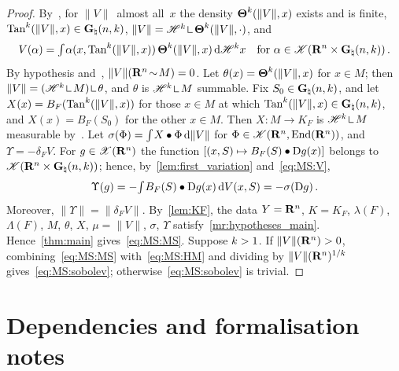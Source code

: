 \documentclass[a4paper,twoside,leqno]{article}
\begin{document}
\begin{proof}
    By~\cite[3.5(1)]{Allard1972}, for $\|V\|$~almost all~$x$ the density
    $\boldsymbol{\Theta}^{k}(\|V\|,x)$ exists and is finite, $\operatorname{Tan}^{k}(\|V\|,x) \in
    \mathbf{G}_{\natural}(n,k)$, $\|V\| = \HM^{\vdim} \restrict \density^{\vdim}(\|V\|,\cdot)$, and
    \begin{equation}
        \label{eq:MS:V}
        V(\alpha) = {\textstyle\int_{}^{}} \alpha(x,\operatorname{Tan}^{k}(\|V\|,x)) \, \boldsymbol{\Theta}^{k}(\|V\|,x) \,\mathrm{d}
        \mathscr{H}^{k} x
        \quad \text{for $\alpha \in \mathscr{K}(\mathbf{R}^{n} \times \mathbf{G}_{\natural}(n,k))$} \,.
    \end{equation}
    By hypothesis and~\cite[3.5(1)]{Allard1972}, $\|V\|(\mathbf{R}^{n} \!\sim\! M) = 0$. Let $\theta(x) = \boldsymbol{\Theta}^{k}(\|V\|,x)$
    for $x \in M$; then $\|V\| = (\HM^{\vdim} \restrict M) \restrict \theta$, and $\theta$ is
    $\HM^{\vdim} \restrict M$ summable. Fix $S_0 \in \mathbf{G}_{\natural}(n,k)$, and let $X(x) =
    B_F(\operatorname{Tan}^{k}(\|V\|,x))$ for those $x \in M$ at which $\operatorname{Tan}^{k}(\|V\|,x) \in
    \mathbf{G}_{\natural}(n,k)$, and $X(x) = B_F(S_0)$ for the other $x \in M$. Then $X : M \to K_F$ is
    $\HM^{\vdim} \restrict M$ measurable by~\cite[3.5(1)]{Allard1972}. Let $\sigma(\Phi) =
    {\textstyle\int_{}^{}} X \bullet \Phi \,\mathrm{d} \|V\|$ for $\Phi \in
    \mathscr{K}(\mathbf{R}^{n},\mathrm{End}({\mathbf{R}^{n}}))$, and $\Upsilon = - \delta_F V$. For $g \in
    \mathscr{X}(\mathbf{R}^{n})$ the function $[(x,S) \mapsto B_F(S) \bullet \mathrm{D} g(x)]$ belongs to
    $\mathscr{K}(\mathbf{R}^{n} \times \mathbf{G}_{\natural}(n,k))$; hence, by~\ref{lem:first_variation}
    and~\eqref{eq:MS:V},
    \begin{displaymath}
        \Upsilon(g) = - {\textstyle\int_{}^{}} B_F(S) \bullet \mathrm{D} g(x) \,\mathrm{d} V(x,S) = - \sigma(\mathrm{D} g) \,.
    \end{displaymath}
    Moreover, $\|\Upsilon\| = \|\delta_F V\|$. By~\ref{lem:KF}, the data $Y = \mathbf{R}^{n}$, $K =
    K_F$, $\lambda(F)$, $\Lambda(F)$, $M$, $\theta$, $X$, $\mu = \|V\|$, $\sigma$, $\Upsilon$
    satisfy~\ref{mr:hypotheses_main}. Hence~\ref{thm:main} gives~\eqref{eq:MS:MS}.
    Suppose $k > 1$. If $\|V\|(\mathbf{R}^{n}) > 0$, combining~\eqref{eq:MS:MS}
    with~\eqref{eq:MS:HM} and dividing by $\|V\|(\mathbf{R}^{n})^{1/k}$ gives~\eqref{eq:MS:sobolev};
    otherwise~\eqref{eq:MS:sobolev} is trivial.
\end{proof}

\section{Dependencies and formalisation notes}
\label{sec:summary}
\end{document}
